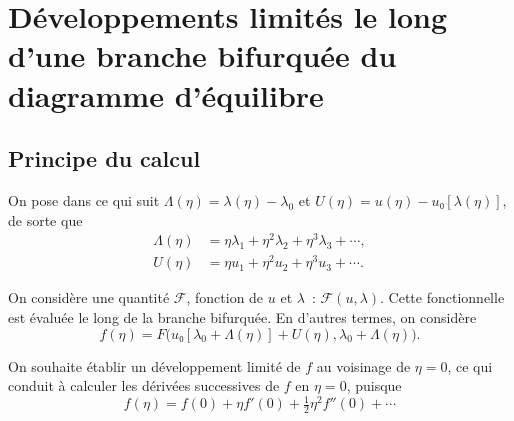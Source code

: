 \documentclass[12pt, final]{amsart}
\begin{document}
\section{Développements limités le long d'une branche bifurquée du diagramme
  d'équilibre}

\subsection{Principe du calcul}

On pose dans ce qui suit \(\Lambda(η)=\lambda(η)-\lambda_0\) et
\(U(η)=u(η)-u₀[\lambda(η)]\), de sorte que
\begin{align}
  \label{eq:20211112155446}
  \Lambda(η)&=η\lambda_1+η^2\lambda_2+η^3\lambda_3+\cdots,\\
  \label{eq:20211112113028}
  U(η)&=η u_1+η^2 u_2+η^3u_3+\cdots.
\end{align}

On considère une quantité \(\mathcal F\), fonction de \(u\) et \(\lambda\)~:
\(\mathcal F(u, \lambda)\). Cette fonctionnelle est évaluée le long de la
branche bifurquée. En d'autres termes, on considère
\begin{equation}
  f(η)=F\bigl(u₀[\lambda_0+\Lambda(η)]+U(η),
  \lambda_0+\Lambda(η)\bigr).
\end{equation}

On souhaite établir un développement limité de \(f\) au voisinage de
\(η=0\), ce qui conduit à calculer les dérivées successives de \(f\) en
\(η=0\), puisque
\begin{equation}
  f(η)=f(0)+η f'(0)+\tfrac12η^2f''(0)+\cdots
\end{equation}
\end{document}
